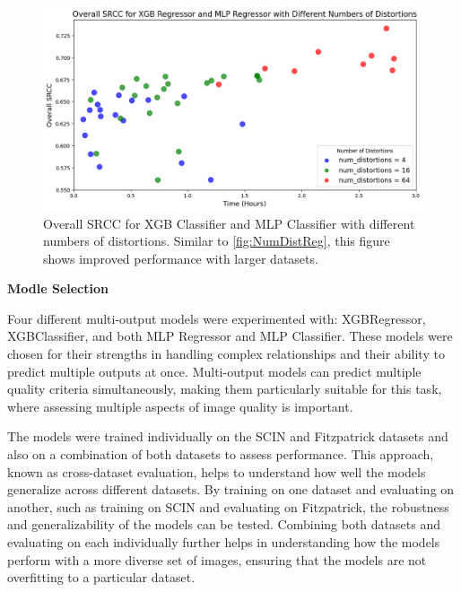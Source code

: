 \begin{figure}[ht]
    \centering
    \includegraphics[keepaspectratio,width=15cm]{img/num_dist_cls.png}
    \caption{Overall SRCC for XGB Classifier and MLP Classifier with different numbers of distortions. Similar to \autoref{fig:NumDistReg}, this figure shows improved performance with larger datasets.}
    \label{fig:NumDistCls}
\end{figure}
\vspace{\baselineskip}
\noindent
\textbf{Modle Selection} \par
\noindent
Four different multi-output models were experimented with: XGBRegressor, XGBClassifier, and both MLP Regressor and MLP Classifier. These models were chosen for their strengths in handling complex relationships and their ability to predict multiple outputs at once. Multi-output models can predict multiple quality criteria simultaneously, making them particularly suitable for this task, where assessing multiple aspects of image quality is important. \par
\vspace{\baselineskip}
\noindent
The models were trained individually on the SCIN and Fitzpatrick datasets and also on a combination of both datasets to assess performance. This approach, known as cross-dataset evaluation, helps to understand how well the models generalize across different datasets. By training on one dataset and evaluating on another, such as training on SCIN and evaluating on Fitzpatrick, the robustness and generalizability of the models can be tested. Combining both datasets and evaluating on each individually further helps in understanding how the models perform with a more diverse set of images, ensuring that the models are not overfitting to a particular dataset. \par 
\vspace{\baselineskip}
